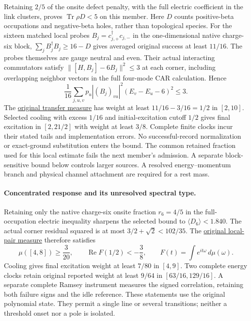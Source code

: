 Retaining $2/5$ of the onsite defect penalty, with the full electric
coefficient in the link clusters, proves $\operatorname{Tr}\rho D<5$
on this member. Here $D$ counts positive-beta occupations and
negative-beta holes, rather than topological species. For the sixteen
matched local probes $B_j=c_{j,+}^{\dagger}c_{j,-}$ in the
one-dimensional native charge-six block,
$\sum_j B_j^\dagger B_j\ge16-D$ gives averaged original success at
least $11/16$. The probes themselves are gauge neutral and even.
Their actual interacting commutators satisfy
$\|[H,B_j]-6B_j\|^2\le3$ at each corner, including overlapping
neighbor vectors in the full four-mode CAR calculation. Hence
\[
 \frac1{16}\sum_{j,u,v}p_u |(B_j)_{vu}|^2
       (E_v-E_u-6)^2\le3.
\]
The \href{https://github.com/FloatingPragma/observer-patch-holography/blob/main/model/particle_primary_response_moments/PROOF.md}{original transfer measure}
has weight at least $11/16-3/16=1/2$ in $[2,10]$.
Selected cooling with excess $1/16$ and initial-excitation cutoff $1/2$
gives final excitation in $[2,21/2]$ with weight at least $3/8$.
Complete finite clocks incur their stated tails and implementation errors.
No successful-record normalization or exact-ground substitution enters
the bound. The common retained fraction used for this local estimate
fails the next member's admission. A separate block-sensitive bound below
controls larger sources. A resolved energy--momentum branch and physical
channel attachment are required for a rest mass.

\paragraph{Concentrated response and its unresolved spectral type.}
Retaining only the native charge-six onsite fraction $r_6=4/5$ in
the full-occupation electric inequality sharpens the selected bound to
$\langle D_6\rangle<1.840$. The actual corner residual squared is
at most $3/2+\sqrt2<102/35$. The
\href{https://github.com/FloatingPragma/observer-patch-holography/blob/main/model/particle_primary_branch_resolution/PROOF.md}{original local-pair measure}
therefore satisfies
\[
 \mu([4,8])\ge\frac3{20},\qquad
 \operatorname{Re}F(1/2)<-\frac38,\qquad
 F(t)=\int e^{it\omega}\,d\mu(\omega).
\]
Cooling gives final excitation weight at least $7/80$ in $[4,9]$.
Two complete energy clocks retain original reported weight at least
$9/64$ in $[63/16,129/16]$. A separate complete Ramsey instrument
measures the signed correlation, retaining both failure signs and the
idle reference. These statements use the original polynomial state.
They permit a single line or several transitions; neither a threshold
onset nor a pole is isolated.

